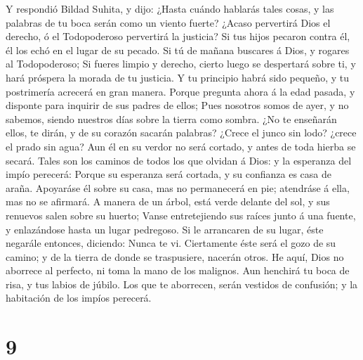  Y respondió Bildad Suhita, y dijo:  ¿Hasta
cuándo hablarás tales cosas, y las palabras de tu boca serán como un
viento fuerte?  ¿Acaso pervertirá Dios el derecho, ó el
Todopoderoso pervertirá la justicia?  Si tus hijos pecaron
contra él, él los echó en el lugar de su pecado.  Si tú de
mañana buscares á Dios, y rogares al Todopoderoso;  Si
fueres limpio y derecho, cierto luego se despertará sobre ti, y hará
próspera la morada de tu justicia.  Y tu principio habrá
sido pequeño, y tu postrimería acrecerá en gran manera. 
Porque pregunta ahora á la edad pasada, y disponte para inquirir de sus
padres de ellos;  Pues nosotros somos de ayer, y no sabemos,
siendo nuestros días sobre la tierra como sombra.  ¿No te
enseñarán ellos, te dirán, y de su corazón sacarán palabras?
 ¿Crece el junco sin lodo? ¿crece el prado sin agua?
 Aun él en su verdor no será cortado, y antes de toda
hierba se secará.  Tales son los caminos de todos los que
olvidan á Dios: y la esperanza del impío perecerá:  Porque
su esperanza será cortada, y su confianza es casa de araña.
 Apoyaráse él sobre su casa, mas no permanecerá en pie;
atendráse á ella, mas no se afirmará.  A manera de un
árbol, está verde delante del sol, y sus renuevos salen sobre su huerto;
 Vanse entretejiendo sus raíces junto á una fuente, y
enlazándose hasta un lugar pedregoso.  Si le arrancaren de
su lugar, éste negarále entonces, diciendo: Nunca te vi. 
Ciertamente éste será el gozo de su camino; y de la tierra de donde se
traspusiere, nacerán otros.  He aquí, Dios no aborrece al
perfecto, ni toma la mano de los malignos.  Aun henchirá tu
boca de risa, y tus labios de júbilo.  Los que te
aborrecen, serán vestidos de confusión; y la habitación de los impíos
perecerá.

\hypertarget{section-8}{%
\section{9}\label{section-8}}

